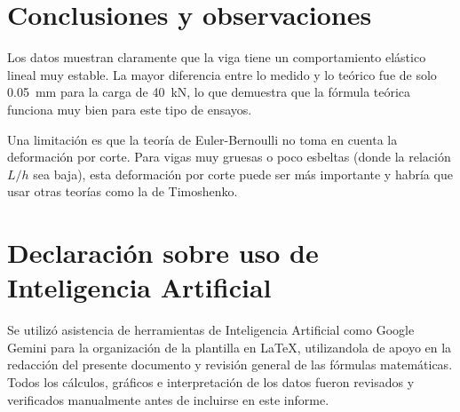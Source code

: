 \section{Conclusiones y observaciones}
Los datos muestran claramente que la viga tiene un comportamiento elástico lineal muy estable. La mayor diferencia entre lo medido y lo teórico fue de solo \SI{0.05}{\milli\meter} para la carga de \SI{40}{\kilo\newton}, lo que demuestra que la fórmula teórica funciona muy bien para este tipo de ensayos.

Una limitación es que la teoría de Euler-Bernoulli \citep{Gere2009, Hibbeler2017} no toma en cuenta la deformación por corte. Para vigas muy gruesas o poco esbeltas (donde la relación $L/h$ sea baja), esta deformación por corte puede ser más importante y habría que usar otras teorías como la de Timoshenko.

\section{Declaración sobre uso de Inteligencia Artificial}
Se utilizó asistencia de herramientas de Inteligencia Artificial como Google Gemini para la organización de la plantilla en \LaTeX, utilizandola de apoyo en la redacción del presente documento y revisión general de las fórmulas matemáticas. Todos los cálculos, gráficos e interpretación de los datos fueron revisados y verificados manualmente antes de incluirse en este informe.